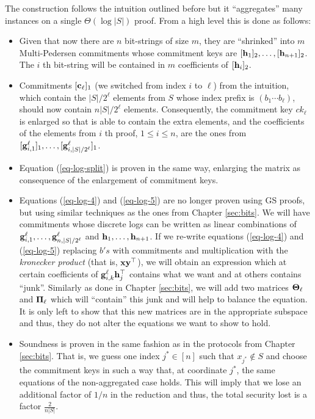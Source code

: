 The construction follows the intuition outlined before but it ``aggregates'' many instances on a single $\Theta(\log |S|)$ proof. From a high level this is done as follows:
\begin{itemize}
\item Given that now there are $n$ bit-strings of size $m$, they are ``shrinked'' into $m$ Multi-Pedersen commitments whose commitment keys are $[\mathbf{h}_1]_2,\ldots,[\mathbf{h}_{n+1}]_2$. The $i$ th bit-string will be contained in $m$ coefficients of $[\mathbf{h}_i]_2$.
\item Commitments $[\mathbf{c}_\ell]_1$ (we switched from index $i$ to $\ell$) from the intuition, which contain the $|S|/2^\ell$ elements from $S$ whose index prefix is $(b_1\cdots b_{\ell})$, should now contain $n|S|/2^\ell$ elements. Consequently, the commitment key $ck_\ell$ is enlarged so that is able to contain the extra elements, and the coefficients of the elements from $i$ th proof, $1\leq i\leq n$, are the ones from $[\mathbf{g}_{i,1}^\ell]_1,\ldots,[\mathbf{g}_{i,|S|/2^\ell}^\ell]_1$.
\item Equation (\ref{eq-log-split}) is proven in the same way, enlarging the matrix as consequence of the enlargement of commitment keys.
\item Equations (\ref{eq-log-4}) and (\ref{eq-log-5}) are no longer proven using GS proofs, but using similar techniques as the ones from Chapter \ref{sec:bits}. We will have commitments whose discrete logs can be written as linear combinations of $\mathbf{g}_{i,1}^\ell,\ldots,\mathbf{g}_{n,|S|/2^\ell}^\ell$ and $\mathbf{h}_1,\ldots,\mathbf{h}_{n+1}$. If we re-write equations (\ref{eq-log-4}) and (\ref{eq-log-5}) replacing $b's$ with commitments and multiplication with the \emph{kronecker product} (that is, $\mathbf{x}\mathbf{y}^\top$), we will obtain an expression which at certain coefficients of $\mathbf{g}_{i,k}^\ell\mathbf{h}_j^\top$ contains what we want and at others contains ``junk''. Similarly as done in Chapter \ref{sec:bits}, we will add two matrices $\mathbf{{\Theta}}_\ell$ and $\mathbf{{\Pi}}_\ell$ which will ``contain'' this junk and will help to balance the equation. It is only left to show that this new matrices are in the appropriate subspace and thus, they do not alter the equations we want to show to hold.
\item Soundness is proven in the same fashion as in the protocols from Chapter \ref{sec:bits}. That is, we guess one index $j^*\in[n]$ such that $x_{j^*}\notin S$ and choose the commitment keys in such a way that, at coordinate $j^*$, the same equations of the non-aggregated case holds. This will imply that we lose an additional factor of $1/n$ in the reduction and thus, the total security lost is a factor $\frac{2}{n|S|}$.
\end{itemize}
